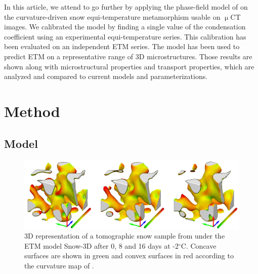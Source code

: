 \documentclass[draft,ms]{agujournal2019}
\begin{document}
In this article, we attend to go further by applying the phase-field model of  on the curvature-driven snow equi-temperature metamorphism usable on $\upmu$CT images. We calibrated the model by finding a single value of the condensation coefficient using an experimental equi-temperature series. This calibration has been evaluated on an independent ETM series. The model has been used to predict ETM on a representative range of 3D microstructures. Those results are shown along with microstructural properties and transport properties, which are analyzed and compared to current models and parameterizations. 

\section{Method}
\label{sec:method}
\subsection{Model}
\label{subsec:model}
\begin{figure}
    \centering
    \includegraphics[width=\linewidth]{Figures/eboni_sous_volumes_simu.pdf}
    \caption{3D representation of a tomographic snow sample from \protect{} under the ETM model Snow-3D after 0, 8 and 16 days at -2$^\circ$C. Concave surfaces are shown in green and convex surfaces in red according to the curvature map of \protect\cite{ogawa2006representation}.}
    \label{fig:eboni_sous_volume}
\end{figure}
\end{document}
